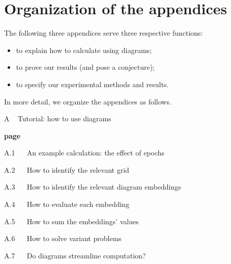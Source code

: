\documentclass[anon,12pt]{colt2021} %
\begin{document}
    
    
    \appendix

    \newpage
    \section*{Organization of the appendices}
        The following three appendices serve three respective functions:
        \begin{itemize}[noitemsep]
            \item to explain how to calculate using diagrams;
            \item to prove our results (and pose a conjecture);
            \item to specify our experimental methods and results.
        \end{itemize}
        In more detail, we organize the appendices as follows.\\
    
        {\bf
        \par\noindent A ~ Tutorial: how to use diagrams}                        \hfill {\bf page \pageref{appendix:tutorial}}
        \par\indent     A.1 ~~ An example calculation: the effect of epochs     \hfill \pageref{appendix:example}
        \par\indent     A.2 ~~ How to identify the relevant grid                \hfill \pageref{appendix:draw-spacetime} 
        \par\indent     A.3 ~~ How to identify the relevant diagram embeddings  \hfill \pageref{appendix:draw-embeddings}
        \par\indent     A.4 ~~ How to evaluate each embedding                   \hfill \pageref{appendix:evaluate-embeddings}
        \par\indent     A.5 ~~ How to sum the embeddings' values                \hfill \pageref{appendix:sum-embeddings}
        \par\indent     A.6 ~~ How to solve variant problems                    \hfill \pageref{appendix:solve-variants}
        \par\indent     A.7 ~~ Do diagrams streamline computation?              \hfill \pageref{appendix:diagrams-streamline}
    
\end{document}
